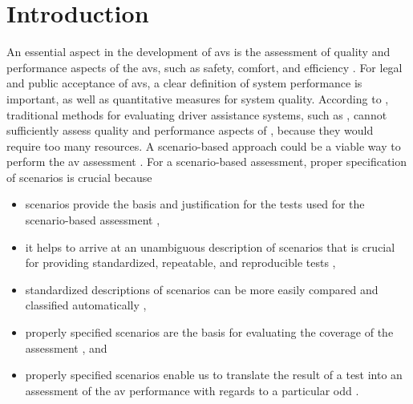 \section{Introduction}
\label{sec:introduction}

An essential aspect in the development of \acp{av} is the assessment of quality and performance aspects of the \acp{av}, such as safety, comfort, and efficiency \autocite{bengler2014threedecades, wachenfeld2016release, Helmer2017safety, stellet2015taxonomy, gietelink2006development, putz2017pegasus, roesener2017comprehensive, riedmaier2020survey}.
For legal and public acceptance of \acp{av}, a clear definition of system performance is important, as well as quantitative measures for system quality. 
According to \autocite{wachenfeld2016release}, traditional methods for evaluating driver assistance systems, such as \autocite{response2006code, ISO26262}, cannot sufficiently assess quality and performance aspects of , because they would require too many resources. 
\cstartc A scenario-based approach could be a viable way to perform the \ac{av} assessment \autocite{putz2017pegasus, elrofai2018scenario, riedmaier2020survey}. 
For a scenario-based assessment, proper specification of scenarios is crucial because 
\begin{itemize}
	\item scenarios \cendc\cstartd provide the basis and justification for \cendd\cstartc the tests used for the scenario-based assessment \autocite{stellet2015taxonomy, aparicio2013pre, ulbrich2015, geyer2014, putz2017pegasus, zofka2015datadrivetrafficscenarios},
	\item it helps to arrive at an unambiguous description of scenarios that is crucial for providing standardized, repeatable, and reproducible tests \autocite{aparicio2013pre},
	\item standardized descriptions of scenarios can be more easily compared and classified \cendc\cstartd automatically \cendd\cstartc\autocite{degelder2019scenariocategories},
	\item properly specified scenarios are the basis for evaluating the coverage of the assessment \autocite{putz2017pegasus}, and
	\item properly specified scenarios enable us to translate the result of a test into an assessment of the \ac{av} performance with regards to a particular \ac{odd} \autocite{weber2019framework, gyllenhammar2020towards}.
\end{itemize}

